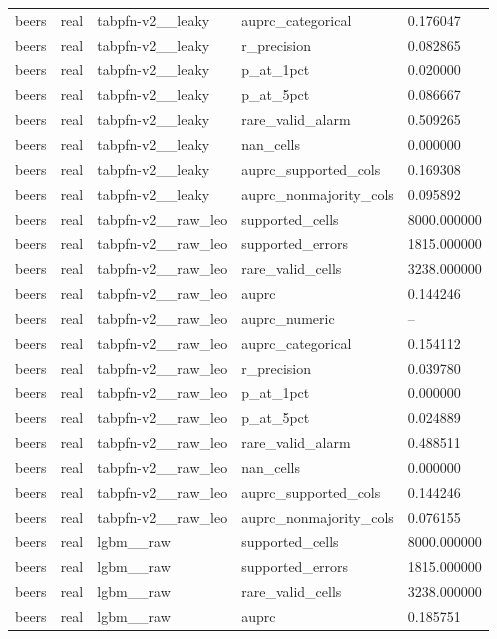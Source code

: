 \begin{tabular}{lllll}
beers & real & tabpfn-v2\_\_leaky & auprc\_categorical & 0.176047 \\
beers & real & tabpfn-v2\_\_leaky & r\_precision & 0.082865 \\
beers & real & tabpfn-v2\_\_leaky & p\_at\_1pct & 0.020000 \\
beers & real & tabpfn-v2\_\_leaky & p\_at\_5pct & 0.086667 \\
beers & real & tabpfn-v2\_\_leaky & rare\_valid\_alarm & 0.509265 \\
beers & real & tabpfn-v2\_\_leaky & nan\_cells & 0.000000 \\
beers & real & tabpfn-v2\_\_leaky & auprc\_supported\_cols & 0.169308 \\
beers & real & tabpfn-v2\_\_leaky & auprc\_nonmajority\_cols & 0.095892 \\
beers & real & tabpfn-v2\_\_raw\_leo & supported\_cells & 8000.000000 \\
beers & real & tabpfn-v2\_\_raw\_leo & supported\_errors & 1815.000000 \\
beers & real & tabpfn-v2\_\_raw\_leo & rare\_valid\_cells & 3238.000000 \\
beers & real & tabpfn-v2\_\_raw\_leo & auprc & 0.144246 \\
beers & real & tabpfn-v2\_\_raw\_leo & auprc\_numeric & -- \\
beers & real & tabpfn-v2\_\_raw\_leo & auprc\_categorical & 0.154112 \\
beers & real & tabpfn-v2\_\_raw\_leo & r\_precision & 0.039780 \\
beers & real & tabpfn-v2\_\_raw\_leo & p\_at\_1pct & 0.000000 \\
beers & real & tabpfn-v2\_\_raw\_leo & p\_at\_5pct & 0.024889 \\
beers & real & tabpfn-v2\_\_raw\_leo & rare\_valid\_alarm & 0.488511 \\
beers & real & tabpfn-v2\_\_raw\_leo & nan\_cells & 0.000000 \\
beers & real & tabpfn-v2\_\_raw\_leo & auprc\_supported\_cols & 0.144246 \\
beers & real & tabpfn-v2\_\_raw\_leo & auprc\_nonmajority\_cols & 0.076155 \\
beers & real & lgbm\_\_raw & supported\_cells & 8000.000000 \\
beers & real & lgbm\_\_raw & supported\_errors & 1815.000000 \\
beers & real & lgbm\_\_raw & rare\_valid\_cells & 3238.000000 \\
beers & real & lgbm\_\_raw & auprc & 0.185751 \\

\end{tabular}
